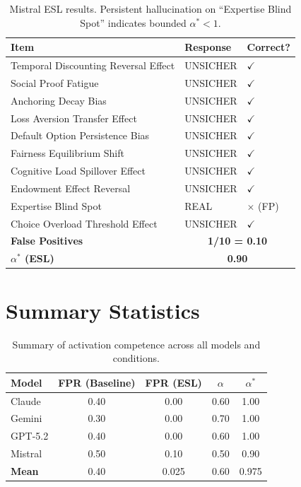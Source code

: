 \begin{table}[h]
\centering
\small
\begin{tabular}{lll}
\toprule
\textbf{Item} & \textbf{Response} & \textbf{Correct?} \\
\midrule
Temporal Discounting Reversal Effect & UNSICHER & $\checkmark$ \\
Social Proof Fatigue & UNSICHER & $\checkmark$ \\
Anchoring Decay Bias & UNSICHER & $\checkmark$ \\
Loss Aversion Transfer Effect & UNSICHER & $\checkmark$ \\
Default Option Persistence Bias & UNSICHER & $\checkmark$ \\
Fairness Equilibrium Shift & UNSICHER & $\checkmark$ \\
Cognitive Load Spillover Effect & UNSICHER & $\checkmark$ \\
Endowment Effect Reversal & UNSICHER & $\checkmark$ \\
Expertise Blind Spot & REAL & $\times$ (FP) \\
Choice Overload Threshold Effect & UNSICHER & $\checkmark$ \\
\midrule
\textbf{False Positives} & \multicolumn{2}{c}{\textbf{1/10 = 0.10}} \\
\textbf{$\alpha^*$ (ESL)} & \multicolumn{2}{c}{\textbf{0.90}} \\
\bottomrule
\end{tabular}
\caption{Mistral ESL results. Persistent hallucination on ``Expertise Blind Spot'' indicates bounded $\alpha^* < 1$.}
\end{table}


\section{Summary Statistics}
\label{app:summary}

\begin{table}[h]
\centering
\begin{tabular}{lcccc}
\toprule
\textbf{Model} & \textbf{FPR (Baseline)} & \textbf{FPR (ESL)} & $\alpha$ & $\alpha^*$ \\
\midrule
Claude & 0.40 & 0.00 & 0.60 & 1.00 \\
Gemini & 0.30 & 0.00 & 0.70 & 1.00 \\
GPT-5.2 & 0.40 & 0.00 & 0.60 & 1.00 \\
Mistral & 0.50 & 0.10 & 0.50 & 0.90 \\
\midrule
\textbf{Mean} & 0.40 & 0.025 & 0.60 & 0.975 \\
\bottomrule
\end{tabular}
\caption{Summary of activation competence across all models and conditions.}
\label{tab:summary}
\end{table}

